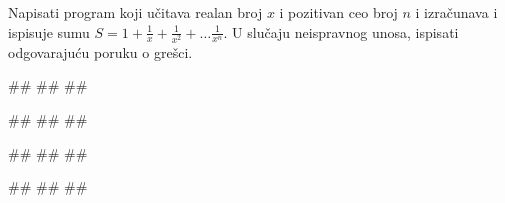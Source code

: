\begin{Exercise}[label=PET_41]
Napisati program koji učitava realan broj $x$ i pozitivan ceo broj $n$ i 
izračunava i ispisuje sumu
$S=1+\frac{1}{x}+\frac{1}{x^2}+\ldots\frac{1}{x^n}$.
U slučaju neispravnog unosa, ispisati odgovarajuću poruku o grešci.

\begin{miditest}
\begin{upotreba}{1}
#\naslovInt#
##
##
\end{upotreba}
\end{miditest}
\begin{miditest}
\begin{upotreba}{2}
#\naslovInt#
##
##
\end{upotreba}
\end{miditest}

\begin{miditest}
\begin{upotreba}{3}
#\naslovInt#
##
##
\end{upotreba}
\end{miditest}
\begin{miditest}
\begin{upotreba}{4}
#\naslovInt#
##
##
\end{upotreba}
\end{miditest}

\end{Exercise}
\ifresenja
\begin{Answer}[ref=PET_41]
\end{Answer}
\fi


